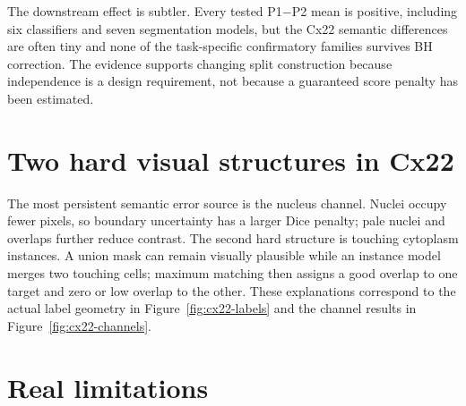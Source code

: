 \documentclass[11pt,oneside]{report}
\newcommand{\protocol}[1]{\textsf{#1}}
\begin{document}
The downstream effect is subtler. Every tested \protocol{P1}$-$\protocol{P2} mean is positive, including six classifiers and seven segmentation models, but the Cx22 semantic differences are often tiny and none of the task-specific confirmatory families survives BH correction. The evidence supports changing split construction because independence is a design requirement, not because a guaranteed score penalty has been estimated.

\section{Two hard visual structures in Cx22}

The most persistent semantic error source is the nucleus channel. Nuclei occupy fewer pixels, so boundary uncertainty has a larger Dice penalty; pale nuclei and overlaps further reduce contrast. The second hard structure is touching cytoplasm instances. A union mask can remain visually plausible while an instance model merges two touching cells; maximum matching then assigns a good overlap to one target and zero or low overlap to the other. These explanations correspond to the actual label geometry in Figure~\ref{fig:cx22-labels} and the channel results in Figure~\ref{fig:cx22-channels}.

\section{Real limitations}
\end{document}
